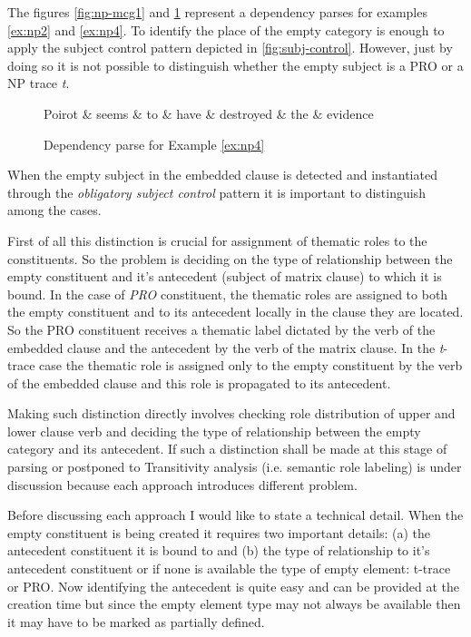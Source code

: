 The figures \ref{fig:np-mcg1} and \ref{fig:np-mcg2} represent a dependency parses for examples \ref{ex:np2} and \ref{ex:np4}. To identify the place of the empty category is enough to apply the subject control pattern depicted in \ref{fig:subj-control}. However, just by doing so it is not possible to distinguish whether the empty subject is a PRO or a NP trace \textit{t}. 

\begin{figure}[H]
	\centering
	\begin{dependency}
		\begin{deptext}[]
			Poirot \& seems \& to \& have \& destroyed \& the \& evidence \\
		\end{deptext}
	\end{dependency}
	\caption{Dependency parse for Example \ref{ex:np4}}
	\label{fig:np-mcg2} 
\end{figure}

When the empty subject in the embedded clause is detected and instantiated through the \textit{obligatory subject control} pattern it is important to distinguish among the cases. 

First of all this distinction is crucial for assignment of thematic roles to the constituents. So the problem is deciding on the type of relationship between the empty constituent and it's antecedent (subject of matrix clause) to which it is bound. In the case of \textit{PRO} constituent, the thematic roles are assigned to both the empty constituent and to its antecedent locally in the clause they are located. So the PRO constituent receives a thematic label dictated by the verb of the embedded clause and the antecedent by the verb of the matrix clause. In the \textit{t}-trace case the thematic role is assigned only to the empty constituent by the verb of the embedded clause and this role is propagated to its antecedent. 

Making such distinction directly involves checking role distribution of upper and lower clause verb and deciding the type of relationship between the empty category and its antecedent. If such a distinction shall be made at this stage of parsing or postponed to Transitivity analysis (i.e. semantic role labeling) is
under discussion because each approach introduces different problem. 

Before discussing each approach I would like to state a technical detail. When the empty constituent is being created it requires two important details: (a) the antecedent constituent it is bound to and (b) the type of relationship to it's antecedent constituent or if none is available the type of empty element: t-trace or PRO. Now identifying the antecedent is quite easy and can be provided at the creation time but since the empty element type may not always be available then it may have to be marked as partially defined.

